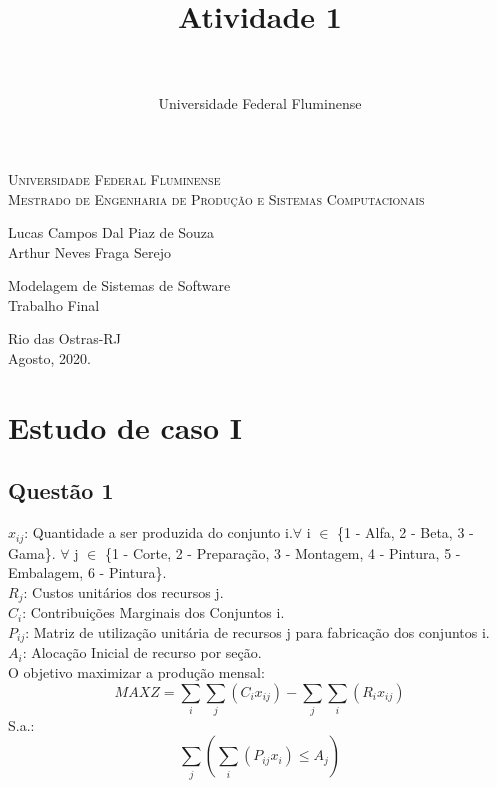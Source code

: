 \documentclass[a4paper,oneside]{article}
\title{Atividade 1}
\author{\\
\\

Universidade Federal Fluminense\\



}
\begin{document}

\begin{titlepage}
  \begin{center}
\Large{\textsc{Universidade Federal Fluminense} \\
           \textsc{Mestrado de Engenharia de Produção e Sistemas Computacionais}
          }
    \par\vfill
    \LARGE{Lucas Campos Dal Piaz de Souza\\Arthur Neves Fraga Serejo}
    \par\vfill
    \LARGE{Modelagem de Sistemas de Software}\\
    \LARGE{Trabalho Final}
    \par\vfill
    \Large{Rio das Ostras-RJ\\Agosto, 2020.}
  \end{center}
\end{titlepage}
\newpage
\tableofcontents
\newpage







\section {Estudo de caso I}
\subsection{Questão 1}
$x_{ij}$: Quantidade a ser produzida do conjunto i.$\forall$ i $\in$ \{1 - Alfa, 2 - Beta, 3 - Gama\}. $\forall$ j $\in$  \{1 - Corte, 2 - Preparação, 3 - Montagem, 4 - Pintura, 5 - Embalagem, 6 - Pintura\}.\\
$R_j$: Custos unitários dos recursos j.
\\
$C_i$: Contribuições Marginais dos Conjuntos i.
\\
$P_{ij}$: Matriz de utilização unitária de recursos j para fabricação dos conjuntos i.
\\
$A_i$: Alocação Inicial de recurso por seção.
\\
O objetivo maximizar a produção mensal:
\begin{equation}
  MAX Z =  \sum_{i} \sum_{j}  (C_{i}x_{ij}) - \sum_{j} \sum_{i}  (R_{i}x_{ij})
\end{equation}
S.a.:
\begin{equation}
    \sum_{j}(\sum_{i} ( P_{ij}x_{i}) \leq  A_{j} )
\end{equation}
\end{document}
